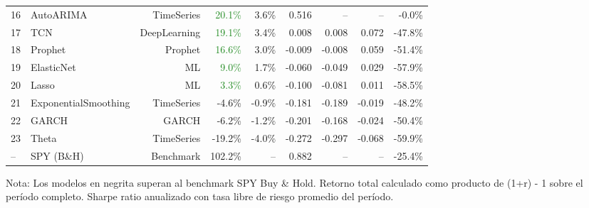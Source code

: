 \begin{table}[htbp]
\begin{tabular}{@{}llrrrrrrr@{}}
16 & AutoARIMA & TimeSeries & \textcolor{ForestGreen}{20.1\%} & 3.6\% & 0.516 & -- & -- & -0.0\% \\
17 & TCN & DeepLearning & \textcolor{ForestGreen}{19.1\%} & 3.4\% & 0.008 & 0.008 & 0.072 & -47.8\% \\
18 & Prophet & Prophet & \textcolor{ForestGreen}{16.6\%} & 3.0\% & -0.009 & -0.008 & 0.059 & -51.4\% \\
19 & ElasticNet & ML & \textcolor{ForestGreen}{9.0\%} & 1.7\% & -0.060 & -0.049 & 0.029 & -57.9\% \\
20 & Lasso & ML & \textcolor{ForestGreen}{3.3\%} & 0.6\% & -0.100 & -0.081 & 0.011 & -58.5\% \\
21 & ExponentialSmoothing & TimeSeries & \textcolor{BrickRed}{-4.6\%} & -0.9\% & -0.181 & -0.189 & -0.019 & -48.2\% \\
22 & GARCH & GARCH & \textcolor{BrickRed}{-6.2\%} & -1.2\% & -0.201 & -0.168 & -0.024 & -50.4\% \\
23 & Theta & TimeSeries & \textcolor{BrickRed}{-19.2\%} & -4.0\% & -0.272 & -0.297 & -0.068 & -59.9\% \\
\midrule
-- & SPY (B\&H) & Benchmark & 102.2\% & -- & 0.882 & -- & -- & -25.4\% \\
\bottomrule
\end{tabular}
\begin{tablenotes}
\small
\item Nota: Los modelos en negrita superan al benchmark SPY Buy \& Hold. Retorno total calculado como producto de (1+r) - 1 sobre el per\'iodo completo. Sharpe ratio anualizado con tasa libre de riesgo promedio del per\'iodo.
\end{tablenotes}
\end{table}
